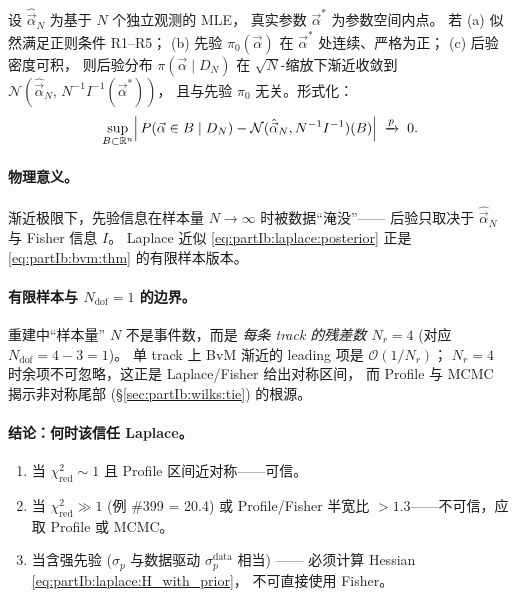 \begin{theorem}
\label{thm:partIb:bvm}
设 $\hat{\vec\alpha}_N$ 为基于 $N$ 个独立观测的 MLE，
真实参数 $\vec\alpha^{*}$ 为参数空间内点。
若 (a) 似然满足正则条件 R1--R5；
(b) 先验 $\pi_0(\vec\alpha)$ 在 $\vec\alpha^{*}$ 处连续、严格为正；
(c) 后验密度可积，
则后验分布 $\pi(\vec\alpha\mid D_N)$ 在 $\sqrt{N}$-缩放下渐近收敛到
$\mathcal N(\hat{\vec\alpha}_N,\,N^{-1}I^{-1}(\vec\alpha^{*}))$，
且与先验 $\pi_0$ 无关。形式化：
\begin{equation}
  \sup_{B\subset\mathbb R^n}
  \Bigl|\,P(\vec\alpha\in B\mid D_N)
        -\mathcal N(\hat{\vec\alpha}_N,N^{-1}I^{-1})(B)\Bigr|
  \;\xrightarrow{p}\;0.
  \label{eq:partIb:bvm:thm}
\end{equation}
\end{theorem}

\paragraph{物理意义。}
渐近极限下，先验信息在样本量 $N\to\infty$ 时被数据“淹没”——
后验只取决于 $\hat{\vec\alpha}_N$ 与 Fisher 信息 $I$。
Laplace 近似 \eqref{eq:partIb:laplace:posterior}
正是 \eqref{eq:partIb:bvm:thm} 的有限样本版本。

\paragraph{有限样本与 $N_{\mathrm{dof}}=1$ 的边界。}
重建中“样本量” $N$ 不是事件数，而是 \emph{每条 track 的残差数 $N_r=4$}
(对应 $N_{\mathrm{dof}} = 4-3 = 1$)。
单 track 上 BvM 渐近的 leading 项是 $\mathcal O(1/N_r)$；
$N_r=4$ 时余项不可忽略，这正是
Laplace/Fisher 给出对称区间，
而 Profile 与 MCMC 揭示非对称尾部 (§\ref{sec:partIb:wilks:tie}) 的根源。

\paragraph{结论：何时该信任 Laplace。}
\begin{enumerate}[label=(\alph*),leftmargin=2em]
  \item 当 $\chi^2_{\mathrm{red}}\sim 1$ 且 Profile 区间近对称——可信。
  \item 当 $\chi^2_{\mathrm{red}}\gg 1$ (例 \#399 = 20.4) 或
        Profile/Fisher 半宽比 $> 1.3$——不可信，应取 Profile 或 MCMC。
  \item 当含强先验 ($\sigma_p$ 与数据驱动 $\sigma_p^{\mathrm{data}}$ 相当) ——
        必须计算 Hessian \eqref{eq:partIb:laplace:H_with_prior}，
        不可直接使用 Fisher。
\end{enumerate}

